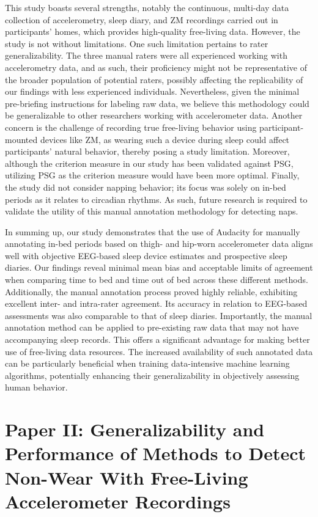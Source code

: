 \documentclass[
  10pt,
]{scrbook}
\begin{document}
This study boasts several strengths, notably the continuous, multi-day
data collection of accelerometry, sleep diary, and ZM recordings carried
out in participants' homes, which provides high-quality free-living
data. However, the study is not without limitations. One such limitation
pertains to rater generalizability. The three manual raters were all
experienced working with accelerometry data, and as such, their
proficiency might not be representative of the broader population of
potential raters, possibly affecting the replicability of our findings
with less experienced individuals. Nevertheless, given the minimal
pre-briefing instructions for labeling raw data, we believe this
methodology could be generalizable to other researchers working with
accelerometer data. Another concern is the challenge of recording true
free-living behavior using participant-mounted devices like ZM, as
wearing such a device during sleep could affect participants' natural
behavior, thereby posing a study limitation. Moreover, although the
criterion measure in our study has been validated against PSG, utilizing
PSG as the criterion measure would have been more optimal. Finally, the
study did not consider napping behavior; its focus was solely on in-bed
periods as it relates to circadian rhythms. As such, future research is
required to validate the utility of this manual annotation methodology
for detecting naps.

In summing up, our study demonstrates that the use of Audacity for
manually annotating in-bed periods based on thigh- and hip-worn
accelerometer data aligns well with objective EEG-based sleep device
estimates and prospective sleep diaries. Our findings reveal minimal
mean bias and acceptable limits of agreement when comparing time to bed
and time out of bed across these different methods. Additionally, the
manual annotation process proved highly reliable, exhibiting excellent
inter- and intra-rater agreement. Its accuracy in relation to EEG-based
assessments was also comparable to that of sleep diaries. Importantly,
the manual annotation method can be applied to pre-existing raw data
that may not have accompanying sleep records. This offers a significant
advantage for making better use of free-living data resources. The
increased availability of such annotated data can be particularly
beneficial when training data-intensive machine learning algorithms,
potentially enhancing their generalizability in objectively assessing
human behavior.

\hypertarget{paper-ii-generalizability-and-performance-of-methods-to-detect-non-wear-with-free-living-accelerometer-recordings}{%
\chapter{Paper II: Generalizability and Performance of Methods to Detect
Non-Wear With Free-Living Accelerometer
Recordings}\label{paper-ii-generalizability-and-performance-of-methods-to-detect-non-wear-with-free-living-accelerometer-recordings}}
\end{document}
